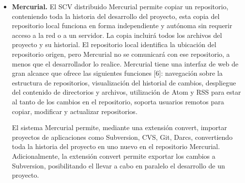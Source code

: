 \documentclass[a4paper,12pt]{article}
\begin{document}
{\begin{itemize}
	\begin{itemize}
		\item Wiki para cada proyecto
		\item Página web para cada proyecto
		\item Gráfico para ver cómo los desarrolladores trabajan en sus repositorios y bifurcaciones del proyecto
		\item Funcionalidades como si se tratase de una red social, por ejemplo: seguidores;
		\item Herramienta para trabajo colaborativo entre programadores.
		\item Gestor de proyectos de estilo Kanban
	\end{itemize}
	Github hace el trabajo en equipo más ágil y sencillo, ayuda a la detección de fallos, a disminuir errores humanos, al seguimiento por etapas del proyecto, al mantenimiento de diferentes entornos, etc. (Freelancer)
	
	
	
	
	
	
	
	
	\item \textbf{Mercurial. }El SCV distribuido Mercurial  permite copiar un repositorio, conteniendo toda la historia del desarrollo del proyecto, esta copia del repositorio local funciona en forma independiente y
	autónoma sin requerir acceso a la red o a un servidor. La copia incluirá todos los archivos del proyecto y su historial. El repositorio local identifica la ubicación del repositorio origen, pero Mercurial no se comunicará con ese repositorio, a menos que el desarrollador lo realice. Mercurial tiene una interfaz de web de gran alcance que ofrece las siguientes funciones [6]: navegación sobre la estructura de repositorios, visualización del historial de cambios, despliegue del contenido de directorios y archivos, utilización de Atom y RSS para estar al tanto de los
	cambios en el repositorio, soporta usuarios remotos para copiar, modificar y actualizar repositorios.
	
	El sistema Mercurial permite, mediante una extensión convert, importar proyectos de aplicaciones como Subversion, CVS, Git, Darcs, convertiendo toda la historia del proyecto en uno nuevo en el repositorio Mercurial. Adicionalmente, la extensión convert permite exportar los cambios a Subversion, posibilitando el llevar a cabo en
	paralelo el desarrollo de un proyecto.
	

\end{itemize}}
\end{document}
